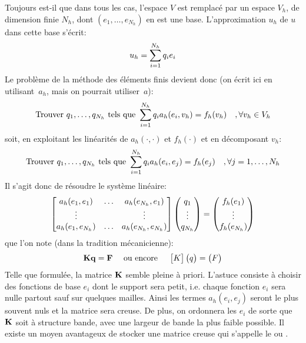 
\medskip
Toujours est-il que dans tous les cas, l'espace $V$ est remplacé par un espace $V_h$, de dimension finie $N_h$, dont $(e_1,\ldots, e_{N_h})$ en est une base. L'approximation $u_h$ de $u$ dans cette base s'écrit:
\begin{equation}
u_h=\displaystyle\sum_{i=1}^{N_h} q_i e_i
\end{equation}
\medskip
Le problème de la méthode des éléments finis devient donc (on écrit ici en utilisant~$a_h$, mais on pourrait utiliser~$a$):
\begin{equation}
\text{Trouver } q_1,\ldots, q_{N_h} \text{ tels que }
\displaystyle\sum_{i=1}^{N_h} q_i a_h(e_i,v_h) = f_h(v_h) \quad , \forall v_h\in V_h
\end{equation}
soit, en exploitant les linéarités de $a_h(\cdot,\cdot)$ et $f_h(\cdot)$ et en décomposant $v_h$:
\begin{equation}\label{Eq-Ph}
\text{Trouver } q_1,\ldots, q_{N_h} \text{ tels que }
\displaystyle\sum_{i=1}^{N_h} q_i a_h(e_i,e_j) = f_h(e_j) \quad ,\forall j=1,\ldots, N_h
\end{equation}
\medskip
Il s'agit donc de résoudre le système linéaire:
\begin{equation}
\MM*{%
a_h(e_1,e_1) & \dots & a_h(e_{N_h},e_1)\\
\vdots & & \vdots \\
a_h(e_1,e_{N_h}) & \dots & a_h(e_{N_h},e_{N_h})
}
\VV*{%
q_1\\
\vdots\\
q_{N_h}
}
=
\VV*{%
f_h(e_1)\\
$\vdots$\\
f_h(e_{N_h})
}
\end{equation}
que l'on note (dans la tradition mécanicienne):
\begin{equation}\mathbf{Kq=F} \quad \text{ ou encore } \quad \MM*{K}\VV*{q}=\VV*{F}
\end{equation}
Telle que formulée, la matrice $\MM{K}$ semble pleine à priori. L'astuce consiste à choisir des fonctions de base $e_i$ dont le support sera petit, i.e. chaque fonction $e_i$ sera nulle partout sauf sur quelques mailles. Ainsi les termes $a_h(e_i,e_j)$ seront le plus souvent nuls et la matrice sera creuse. De plus, on ordonnera les $e_i$ de sorte que $\MM{K}$ soit à structure bande, avec une largeur de bande la plus faible possible. Il existe un moyen avantageux de stocker une matrice creuse qui s'appelle le  ou .

